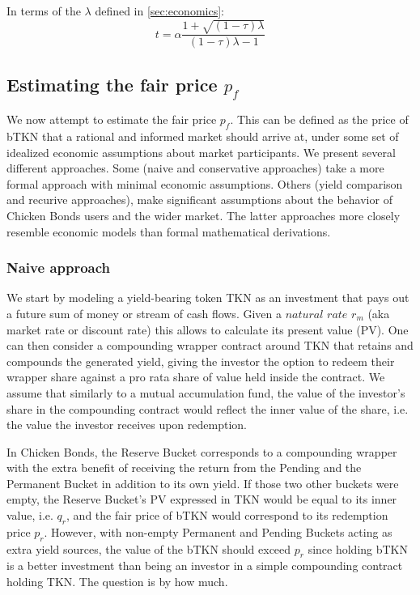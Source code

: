 \documentclass{article}
\begin{document}
In terms of the $\lambda$ defined in \ref{sec:economics}:
\begin{equation}
  \label{eq:optimal_chicken_in_2_fee}
t = \alpha \frac{1 + \sqrt{(1-\tau)\lambda}}{(1-\tau)\lambda - 1}
\end{equation}

\subsection{Estimating the fair price $p_f$}
We now attempt to estimate the fair price $p_f$. This can be defined as the price of bTKN that a rational and informed market should arrive at, under some set of idealized economic assumptions about market participants. We present several different approaches. Some (naive and conservative approaches) take a more formal approach with minimal economic assumptions. Others (yield comparison and recurive approaches), make significant assumptions about the behavior of Chicken Bonds users and the wider market. The latter approaches more closely resemble economic models than formal mathematical derivations.

\subsubsection{Naive approach}
\label{sec:naive_approach}
We start by modeling a yield-bearing token TKN as an investment that pays out a future sum of money or stream of cash flows. Given a $\textit{natural rate}$ $r_m$ (aka market rate or discount rate) this allows to calculate its present value (PV). One can then consider a compounding wrapper contract around TKN that retains and compounds the generated yield, giving the investor the option to redeem their wrapper share against a pro rata share of value held inside the contract. We assume that similarly to a mutual accumulation fund, the value of the investor's share in the compounding contract would reflect the inner value of the share, i.e. the value the investor receives upon redemption. 

In Chicken Bonds, the Reserve Bucket corresponds to a compounding wrapper with the extra benefit of receiving the return from the Pending and the Permanent Bucket in addition to its own yield. If those two other buckets were empty, the Reserve Bucket's PV expressed in TKN would be equal to its inner value, i.e. $q_r$, and the fair price of bTKN would correspond to its redemption price $p_r$. However, with non-empty Permanent and Pending Buckets acting as extra yield sources, the value of the bTKN should exceed $p_r$ since holding bTKN is a better investment than being an investor in a simple compounding contract holding TKN. The question is by how much.
\end{document}
